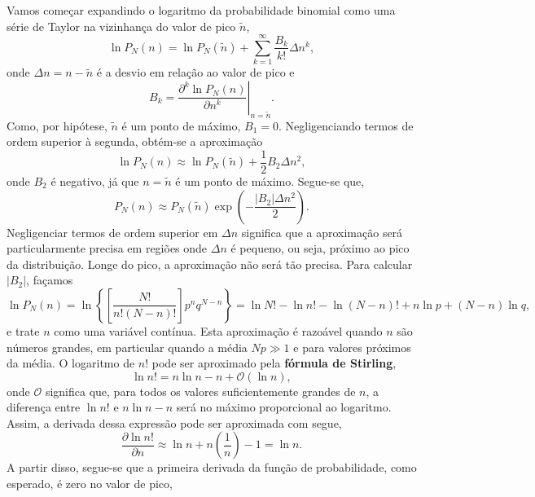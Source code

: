 Vamos começar expandindo o logaritmo da probabilidade binomial como uma série de Taylor na vizinhança do valor de pico $\tilde{n}$,
\begin{equation*}
\ln P_N(n) = \ln P_N(\tilde{n}) + \sum_{k=1}^{\infty} \dfrac{B_k}{k!} \Delta n^k,
\end{equation*}
onde $\Delta n = n - \tilde{n}$ é a desvio em relação ao valor de pico e
\begin{equation*}
B_k = \left. \dfrac{\partial^k \ln P_N(n)}{\partial n^k} \right|_{n=\tilde{n}}.
\end{equation*}
Como, por hipótese, $\tilde{n}$ é um ponto de máximo, $B_1 = 0$. Negligenciando termos de ordem superior à segunda, obtém-se a aproximação
\begin{equation*}
\ln P_N(n) \approx \ln P_N(\tilde{n}) + \dfrac{1}{2} B_2 \Delta n^2,
\end{equation*}
onde $B_2$ é negativo, já que $n = \tilde{n}$ é um ponto de máximo. Segue-se que,
\begin{equation*}
P_N(n) \approx P_N(\tilde{n})\exp\left(-\dfrac{|B_2| \Delta n^2}{2}\right).
\end{equation*}
Negligenciar termos de ordem superior em $\Delta n$ significa que a aproximação será particularmente precisa em regiões onde $\Delta n$ é pequeno, ou seja, próximo ao pico da distribuição. Longe do pico, a aproximação não será tão precisa. Para calcular $|B_2|$, façamos
\begin{equation*}
\ln P_N(n) = \ln\left\{\left[\dfrac{N!}{n!(N-n)!}\right] p^n q^{N-n}\right\} =  \ln N! - \ln n! - \ln (N - n)! + n \ln p + (N - n) \ln q,
\end{equation*}
e trate $n$ como uma variável contínua. Esta aproximação é razoável quando $n$ são números grandes, em particular quando a média $Np \gg 1$ e para valores próximos da média. O logaritmo de $n!$ pode ser aproximado pela \textbf{fórmula de Stirling},
\begin{equation*}
\ln n! = n\ln n - n + \mathcal{O}(\ln n),
\end{equation*}
onde $\mathcal{O}$ significa que, para todos os valores suficientemente grandes de $n$, a diferença entre $\ln n!$ e $n\ln n - n$ será no máximo proporcional ao logaritmo. Assim, a derivada dessa expressão pode ser aproximada com segue,
\begin{equation*}
\dfrac{\partial \ln n!}{\partial n} \approx \ln n + n\left(\dfrac{1}{n}\right) - 1 = \ln n.
\end{equation*}
A partir disso, segue-se que a primeira derivada da função de probabilidade, como esperado, é zero no valor de pico,
